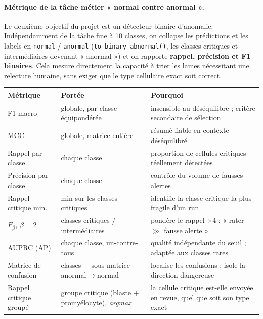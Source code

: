\paragraph{Métrique de la tâche métier « normal contre anormal ».} Le deuxième objectif du projet est un détecteur binaire d'anomalie.
Indépendamment de la tâche fine à 10 classes, on collapse les prédictions et les labels en \texttt{normal} / \texttt{anormal} (\texttt{to\_binary\_abnormal()}, les classes critiques et intermédiaires devenant « anormal ») et on rapporte \textbf{rappel, précision et F1 binaires}.
Cela mesure directement la capacité à trier les lames nécessitant une relecture humaine, sans exiger que le type cellulaire exact soit correct.

\begin{table}[H]
  \centering
  \small
  \setlength{\tabcolsep}{5pt}
  \renewcommand{\arraystretch}{1.2}
  \begin{tabular}{@{}>{\raggedright\arraybackslash}p{3.1cm} >{\raggedright\arraybackslash}p{4.0cm} >{\raggedright\arraybackslash}p{6.2cm}@{}}
    \toprule
    \textbf{Métrique} & \textbf{Portée} & \textbf{Pourquoi} \\
    \midrule
    F1 macro            & globale, par classe équipondérée & insensible au déséquilibre ; critère secondaire de sélection \\
    MCC                 & globale, matrice entière         & résumé fiable en contexte déséquilibré \parencite{chicco2020mcc} \\
    Rappel par classe   & chaque classe                    & proportion de cellules critiques réellement détectées \\
    Précision par classe & chaque classe                   & contrôle du volume de fausses alertes \\
    Rappel critique min.\ & min sur les classes critiques & identifie la classe critique la plus fragile d'un run \\
    $F_\beta$, $\beta=2$ & classes critiques / intermédiaires & pondère le rappel $\times 4$ : « rater $\gg$ fausse alerte » \\
    AUPRC (AP)          & chaque classe, un-contre-tous     & qualité indépendante du seuil ; adaptée aux classes rares \parencite{saito2015prc} \\
    Matrice de confusion & 10 classes + sous-matrice anormal$\rightarrow$normal & localise les confusions ; isole la direction dangereuse \\
    Rappel critique groupé & groupe critique (blaste + promyélocyte), \emph{argmax} & la cellule critique est-elle envoyée en revue, quel que soit son type exact \\

\end{tabular}
\end{table}

